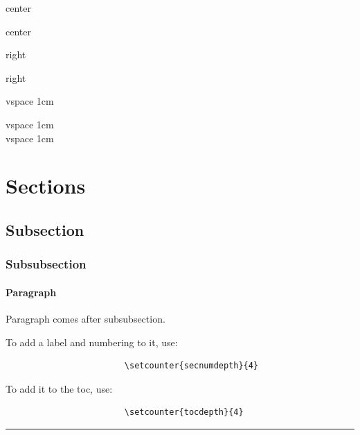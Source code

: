 \documentclass[12pt]{article}
\begin{document}
    \begin{center}
        center

        center
    \end{center}

    \begin{flushright}
        right

        right
    \end{flushright}

    vspace 1cm

    \vspace{1cm}

    vspace 1cm \\[1cm]

    vspace 1cm

\section{Sections}\label{secSec}

    \subsection{Subsection}\label{secSsec}

        \subsubsection{Subsubsection}\label{secSssec}

            \paragraph{Paragraph}

                \begin{remark} \label{rem-paragraph}
                    Paragraph comes after subsubsection.

                    To add a label and numbering to it, use:

                    \begin{lstlisting}
                        \setcounter{secnumdepth}{4}
                    \end{lstlisting}

                    To add it to the toc, use:

                    \begin{lstlisting}
                        \setcounter{tocdepth}{4}
                    \end{lstlisting}

                \end{remark}\hrule
\end{document}
